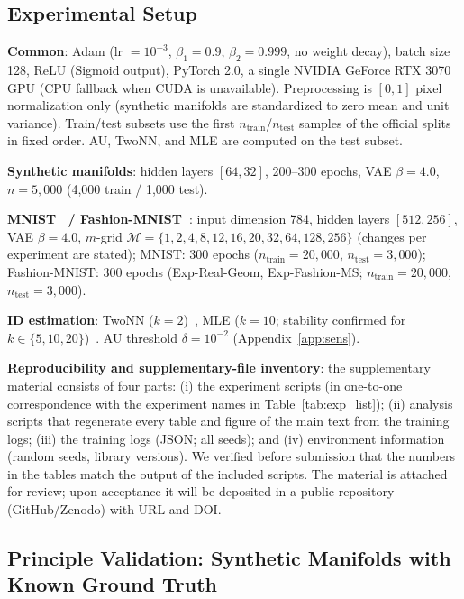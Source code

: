 \documentclass[make,article,submit,pdftex,moreauthors]{Definitions/mdpi}
\begin{document}
\subsection{Experimental Setup}\label{sec:exp_setup}

\textbf{Common}: Adam (lr $= 10^{-3}$, $\beta_1 = 0.9$, $\beta_2 = 0.999$,
no weight decay), batch size 128, ReLU (Sigmoid output), PyTorch 2.0, a
single NVIDIA GeForce RTX 3070 GPU (CPU fallback when CUDA is unavailable).
Preprocessing is $[0,1]$ pixel normalization only (synthetic manifolds are
standardized to zero mean and unit variance).
Train/test subsets use the first $n_{\mathrm{train}}$/$n_{\mathrm{test}}$
samples of the official splits in fixed order.
AU, TwoNN, and MLE are computed on the test subset.

\textbf{Synthetic manifolds}: hidden layers $[64, 32]$, 200--300 epochs,
VAE $\beta = 4.0$, $n = 5{,}000$ (4{,}000 train / 1{,}000 test).

\textbf{MNIST~\cite{lecun1998} / Fashion-MNIST~\cite{xiao2017fashion}}:
input dimension 784, hidden layers
$[512, 256]$, VAE $\beta = 4.0$, $m$-grid
$\mathcal{M} = \{1, 2, 4, 8, 12, 16, 20, 32, 64, 128, 256\}$ (changes per
experiment are stated); MNIST: 300 epochs
($n_{\mathrm{train}} = 20{,}000$, $n_{\mathrm{test}} = 3{,}000$);
Fashion-MNIST: 300 epochs (Exp-Real-Geom, Exp-Fashion-MS;
$n_{\mathrm{train}} = 20{,}000$, $n_{\mathrm{test}} = 3{,}000$).

\textbf{ID estimation}: TwoNN ($k = 2$)~\cite{facco2017twonn}, MLE
($k = 10$; stability confirmed for $k \in \{5, 10, 20\}$)~\cite{levina2005mle}.
AU threshold $\delta = 10^{-2}$ (Appendix~\ref{app:sens}).

\textbf{Reproducibility and supplementary-file inventory}:
the supplementary material consists of four parts:
(i) the experiment scripts (in one-to-one correspondence with the experiment
names in Table~\ref{tab:exp_list});
(ii) analysis scripts that regenerate every table and figure of the main
text from the training logs;
(iii) the training logs (JSON; all seeds); and
(iv) environment information (random seeds, library versions).
We verified before submission that the numbers in the tables match the
output of the included scripts.
The material is attached for review; upon acceptance it will be deposited in
a public repository (GitHub/Zenodo) with URL and DOI.

\subsection{Principle Validation: Synthetic Manifolds with Known Ground Truth}\label{sec:exp_syn}
\end{document}
